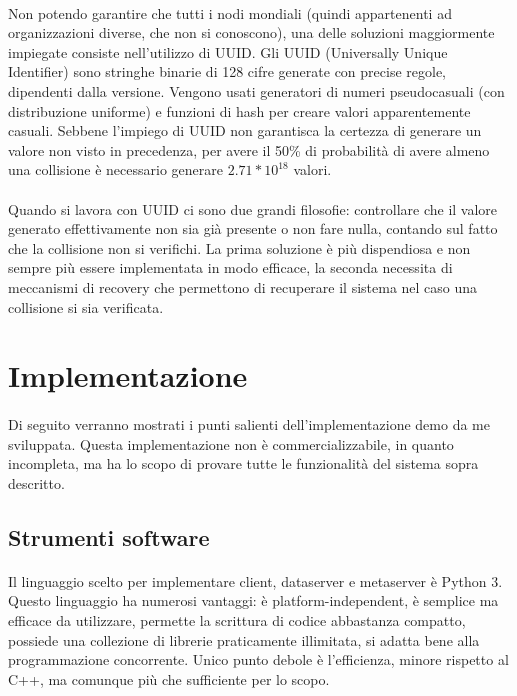 \documentclass{article}
\begin{document}
\paragraph{} Non potendo garantire che tutti i nodi mondiali (quindi appartenenti ad organizzazioni diverse, che non si conoscono), una delle soluzioni maggiormente impiegate consiste nell'utilizzo di UUID. Gli UUID (Universally Unique Identifier) sono stringhe binarie di 128 cifre generate con precise regole, dipendenti dalla versione. Vengono usati generatori di numeri pseudocasuali (con distribuzione uniforme) e funzioni di hash per creare valori apparentemente casuali. Sebbene l'impiego di UUID non garantisca la certezza di generare un valore non visto in precedenza, per avere il 50\% di probabilità di avere almeno una collisione è necessario generare $2.71*10^{18}$ valori.

\paragraph{} Quando si lavora con UUID ci sono due grandi filosofie: controllare che il valore generato effettivamente non sia già presente o non fare nulla, contando sul fatto che la collisione non si verifichi. La prima soluzione è più dispendiosa e non sempre più essere implementata in modo efficace, la seconda necessita di meccanismi di recovery che permettono di recuperare il sistema nel caso una collisione si sia verificata. 


\section{Implementazione}

\paragraph{} Di seguito verranno mostrati i punti salienti dell'implementazione demo da me sviluppata. Questa implementazione non è commercializzabile, in quanto incompleta, ma ha lo scopo di provare tutte le funzionalità del sistema sopra descritto. 

\subsection{Strumenti software}

\paragraph{} Il linguaggio scelto per implementare client, dataserver e metaserver è Python 3. Questo linguaggio ha numerosi vantaggi: è platform-independent, è semplice ma efficace da utilizzare, permette la scrittura di codice abbastanza compatto, possiede una collezione di librerie praticamente illimitata, si adatta bene alla programmazione concorrente. Unico punto debole è l'efficienza, minore rispetto al C++, ma comunque più che sufficiente per lo scopo. 
\end{document}
